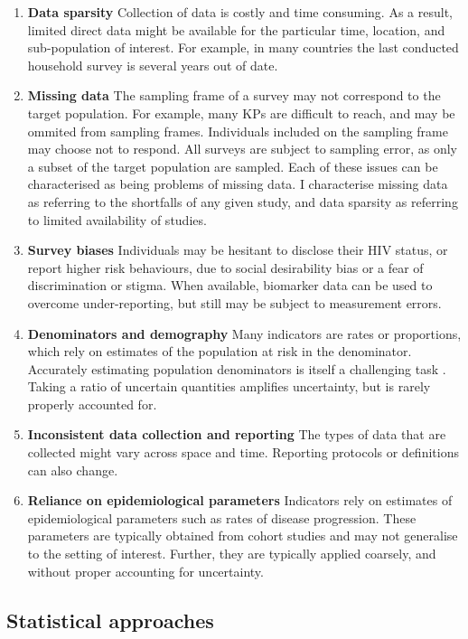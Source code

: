 \documentclass[a4paper, nobind]{templates/ociamthesis}
\providecommand{\tightlist}{%
  \setlength{\itemsep}{0pt}\setlength{\parskip}{0pt}}
\begin{document}
\begin{enumerate}
\def\labelenumi{\arabic{enumi}.}
\tightlist
\item
  \textbf{Data sparsity}
  Collection of data is costly and time consuming.
  As a result, limited direct data might be available for the particular time, location, and sub-population of interest.
  For example, in many countries the last conducted household survey is several years out of date.
\item
  \textbf{Missing data}
  The sampling frame of a survey may not correspond to the target population.
  For example, many KPs are difficult to reach, and may be ommited from sampling frames.
  Individuals included on the sampling frame may choose not to respond.
  All surveys are subject to sampling error, as only a subset of the target population are sampled.
  Each of these issues can be characterised as being problems of missing data.
  I characterise missing data as referring to the shortfalls of any given study, and data sparsity as referring to limited availability of studies.
\item
  \textbf{Survey biases}
  Individuals may be hesitant to disclose their HIV status, or report higher risk behaviours, due to social desirability bias or a fear of discrimination or stigma.
  When available, biomarker data can be used to overcome under-reporting, but still may be subject to measurement errors.
\item
  \textbf{Denominators and demography}
  Many indicators are rates or proportions, which rely on estimates of the population at risk in the denominator.
  Accurately estimating population denominators is itself a challenging task \autocite{tatem2017worldpop}.
  Taking a ratio of uncertain quantities amplifies uncertainty, but is rarely properly accounted for.
\item
  \textbf{Inconsistent data collection and reporting}
  The types of data that are collected might vary across space and time.
  Reporting protocols or definitions can also change.
\item
  \textbf{Reliance on epidemiological parameters}
  Indicators rely on estimates of epidemiological parameters such as rates of disease progression.
  These parameters are typically obtained from cohort studies and may not generalise to the setting of interest.
  Further, they are typically applied coarsely, and without proper accounting for uncertainty.
\end{enumerate}

\hypertarget{statistical-approaches}{%
\subsection{Statistical approaches}\label{statistical-approaches}}
\end{document}
